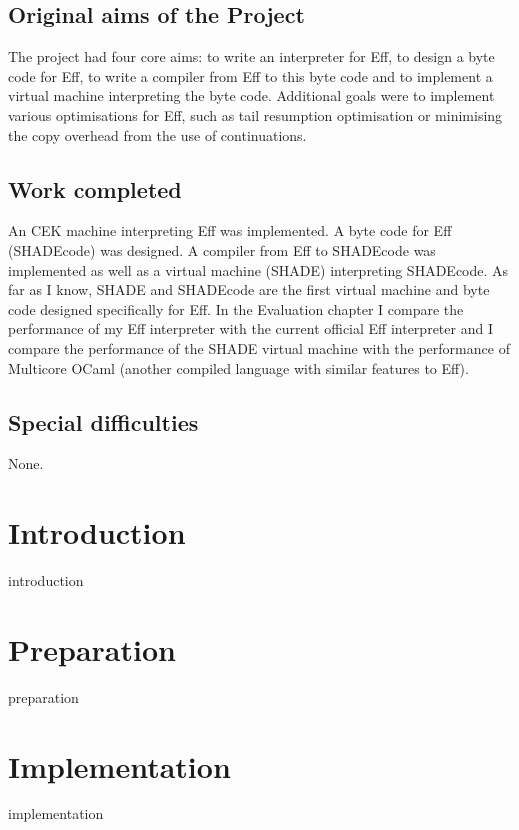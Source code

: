 \documentclass[%
    oneside,
    bibliography=toc,
    listof=leveldown,%
    fontsize=11pt
]{scrbook}
\begin{document}
\section*{Original aims of the Project}

The project had four core aims: to write an interpreter for Eff, to design a byte code for Eff, to write a compiler from Eff to this byte code
and to implement a virtual machine interpreting the byte code. Additional goals were to implement various optimisations for Eff, such as
tail resumption optimisation or minimising the copy overhead from the use of continuations.

\section*{Work completed}

An CEK machine interpreting Eff was implemented. A byte code for Eff (SHADEcode) was designed. A compiler from Eff to SHADEcode was
implemented as well as a virtual machine (SHADE) interpreting SHADEcode. As far as I know, SHADE and SHADEcode are the first
virtual machine and byte code designed specifically for Eff.
In the Evaluation chapter
I compare the performance of my Eff interpreter with the current official Eff interpreter and I compare the performance of the SHADE
virtual machine with the performance of Multicore OCaml (another compiled language with similar features to Eff).

\section*{Special difficulties}
None.

\tableofcontents

\newpage
\listoffigures
\listoftables
\lstlistoflistings

\mainmatter

\chapter{Introduction}
{introduction}

\chapter{Preparation}
{preparation}

\chapter{Implementation}
{implementation}
\end{document}
